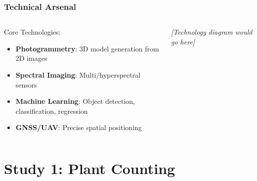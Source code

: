 \documentclass[aspectratio=43]{beamer}
\begin{document}
\begin{frame}
    \frametitle{Technical Arsenal}
    
    \begin{columns}
        \begin{column}{0.6\textwidth}
            \begin{block}{Core Technologies:}
                \begin{itemize}
                    \item \textbf{Photogrammetry}: 3D model generation from 2D images
                    \item \textbf{Spectral Imaging}: Multi/hyperspectral sensors
                    \item \textbf{Machine Learning}: Object detection, classification, regression
                    \item \textbf{GNSS/UAV}: Precise spatial positioning
                \end{itemize}
            \end{block}
        \end{column}
        
        \begin{column}{0.4\textwidth}
            \begin{center}
                \textit{[Technology diagram would go here]}
            \end{center}
        \end{column}
    \end{columns}
\end{frame}

\section{Study 1: Plant Counting}
\end{document}
